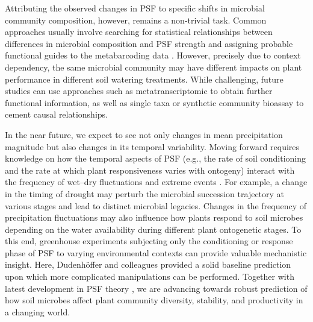 \documentclass[hidelinks,letterpaper, 11pt]{article}
\begin{document}
Attributing the observed changes in PSF to specific shifts in microbial community composition, however, remains a non-trivial task. 
Common approaches usually involve searching for statistical relationships between differences in microbial composition and PSF strength and assigning probable functional guides to the metabarcoding data \citep{Nguyen2016}.
However, precisely due to context dependency, the same microbial community may have different impacts on plant performance in different soil watering treatments.
While challenging, future studies can use approaches such as metatranscriptomic to obtain further functional information, as well as single taxa or synthetic community bioassay to cement causal relationships.
\medskip


In the near future, we expect to see not only changes in mean precipitation magnitude but also changes in its temporal variability.
Moving forward requires knowledge on how the temporal aspects of PSF (e.g., the rate of soil conditioning and the rate at which plant responsiveness varies with ontogeny) interact with the frequency of wet--dry fluctuations and extreme events \citep{Rudgers2020, Ke2021}. 
For example, a change in the timing of drought may perturb the microbial succession trajectory at various stages and lead to distinct microbial legacies. 
Changes in the frequency of precipitation fluctuations may also influence how plants respond to soil microbes depending on the water availability during different plant ontogenetic stages.
To this end, greenhouse experiments subjecting only the conditioning or response phase of PSF to varying environmental contexts can provide valuable mechanistic insight.
Here, Dudenh{\"o}ffer and colleagues provided a solid baseline prediction upon which more complicated manipulations can be performed.
Together with latest development in PSF theory \citep{Kandlikar2019}, we are advancing towards robust prediction of how soil microbes affect plant community diversity, stability, and productivity in a changing world.
\bigskip
\end{document}
